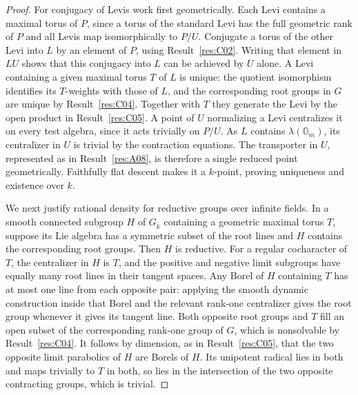 \documentclass[11pt,a4paper,openany,oneside]{book}
\theoremstyle{resultstyle}
\theoremstyle{definition}
\numberwithin{equation}{chapter}
\newcommand{\Gm}{\mathbb{G}_m}
\begin{document}
\begin{proof}
For conjugacy of Levis work first geometrically. Each Levi
contains a maximal torus of \(P\), since a torus of the
standard Levi has the full geometric rank of \(P\) and all
Levis map isomorphically to \(P/U\).
Conjugate a torus of the other Levi into \(L\) by an
element of \(P\), using Result~\ref{res:C02}.
Writing that element in \(LU\) shows that this conjugacy
into \(L\) can be achieved by \(U\) alone.
A Levi containing a given maximal torus \(T\) of \(L\)
is unique: the quotient isomorphism identifies its \(T\)-weights
with those of \(L\), and the corresponding root groups in
\(G\) are unique by Result~\ref{res:C04}.
Together with \(T\) they generate the Levi by the open
product in Result~\ref{res:C05}.
A point of \(U\) normalizing a Levi centralizes it on every
test algebra, since it acts trivially on \(P/U\).
As \(L\) contains \(\lambda(\Gm)\), its centralizer in \(U\)
is trivial by the contraction equations. The transporter in
\(U\), represented as in Result~\ref{res:A08}, is therefore
a single reduced point geometrically. Faithfully flat descent
makes it a \(k\)-point, proving uniqueness and existence
over \(k\).

We next justify rational density for reductive groups over
infinite fields. In a smooth connected subgroup \(H\) of
\(G_{\bar k}\) containing a geometric maximal torus \(T\),
suppose its Lie algebra has a symmetric subset of the
root lines and \(H\) contains the corresponding root groups.
Then \(H\) is reductive. For a regular cocharacter of \(T\),
the centralizer in \(H\) is \(T\), and the positive and negative
limit subgroups have equally many root lines in their tangent
spaces. Any Borel of \(H\) containing \(T\) has at most one
line from each opposite pair: applying the smooth dynamic
construction inside that Borel and the relevant rank-one
centralizer gives the root group whenever it gives its tangent
line. Both opposite root groups and \(T\) fill an open
subset of the corresponding rank-one group of \(G\),
which is nonsolvable by Result~\ref{res:C04}.
It follows by dimension, as in Result~\ref{res:C05}, that
the two opposite limit parabolics of \(H\) are Borels of \(H\).
Its unipotent radical lies in both and maps trivially to \(T\)
in both, so lies in the intersection of the two opposite
contracting groups, which is trivial.


\end{proof}
\end{document}
